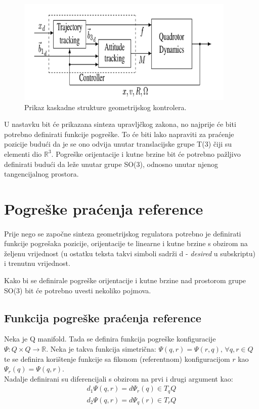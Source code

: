 \documentclass[times, utf8, diplomski, numeric]{fer}
\begin{document}
	\newpage
	\clearpage

	\begin{figure}[h!]
		\includegraphics[width=\textwidth, height=5cm]{figures/controller.png}
		\caption{Prikaz kaskadne strukture geometrijskog kontrolera.}
	\end{figure}
	
	U nastavku bit će prikazana sinteza upravljčkog zakona, no najprije će biti potrebno definirati funkcije pogreške. To će biti lako napraviti za praćenje pozicije budući da je se ono odvija unutar translacijske grupe T(3) čiji su elementi dio $\mathbb{R}^3$. Pogreške orijentacije i kutne brzine bit će potrebno pažljivo definirati budući da leže unutar grupe SO(3), odnosno unutar njenog tangencijalnog prostora.
	
\section{Pogreške praćenja reference}

	\paragraph{}Prije nego se započne sinteza geometrijskog regulatora potrebno je definirati funkcije pogrešaka pozicije, orijentacije te linearne i kutne brzine s obzirom na željenu vrijednost (u ostatku teksta takvi simboli sadrži d - \textit{desired} u subskriptu) i trenutnu vrijednost.
	
	\noindent Kako bi se definirale pogreške orijentacije i kutne brzine nad prostorom grupe SO(3) bit će potrebno uvesti nekoliko pojmova.
	\subsection{Funkcija pogreške praćenja reference} Neka je Q manifold. Tada se definira funkcija pogreške konfiguracije $\Psi : Q \times Q \rightarrow \mathbb{R}$. Neka je takva funkcija simetrična: $\Psi(q, r) = \Psi(r, q), \, \forall q,r\in Q$ te se definira korištenje funkcije sa fiksnom (referentnom) konfiguracijom $r$ kao $\Psi_r(q) = \Psi(q, r)$. \\
	Nadalje definirani su diferencijali s obzirom na prvi i drugi argument kao: 
	\begin{gather}
		d_1 \Psi (q, r) = d \Psi_r(q) \in T_q Q \\
		d_2 \Psi (q, r) = d \Psi_q(r) \in T_r Q
	\end{gather}
	
\end{document}
